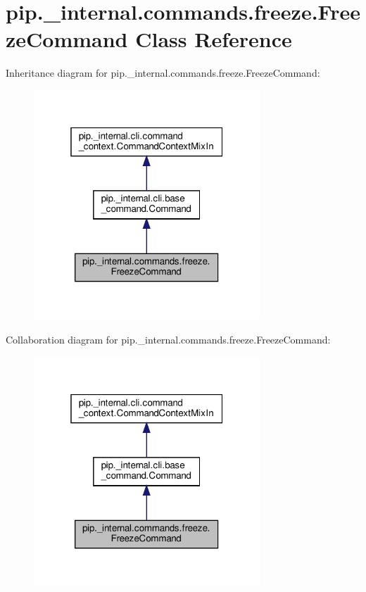 \hypertarget{classpip_1_1__internal_1_1commands_1_1freeze_1_1FreezeCommand}{}\section{pip.\+\_\+internal.\+commands.\+freeze.\+Freeze\+Command Class Reference}
\label{classpip_1_1__internal_1_1commands_1_1freeze_1_1FreezeCommand}


Inheritance diagram for pip.\+\_\+internal.\+commands.\+freeze.\+Freeze\+Command\+:
\nopagebreak
\begin{figure}[H]
\begin{center}
\leavevmode
\includegraphics[width=241pt]{classpip_1_1__internal_1_1commands_1_1freeze_1_1FreezeCommand__inherit__graph}
\end{center}
\end{figure}


Collaboration diagram for pip.\+\_\+internal.\+commands.\+freeze.\+Freeze\+Command\+:
\nopagebreak
\begin{figure}[H]
\begin{center}
\leavevmode
\includegraphics[width=241pt]{classpip_1_1__internal_1_1commands_1_1freeze_1_1FreezeCommand__coll__graph}
\end{center}
\end{figure}
